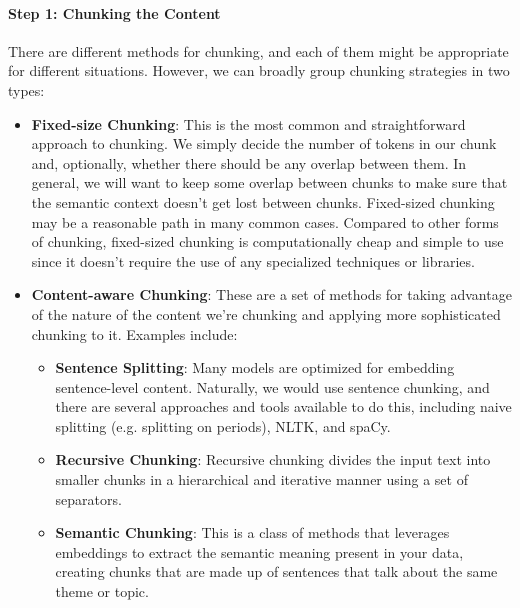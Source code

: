 \paragraph{Step 1: Chunking the Content}

There are different methods for chunking, and each of them might be appropriate for different situations. However, we can broadly group chunking strategies in two types:

\begin{itemize}
\item \textbf{Fixed-size Chunking}: This is the most common and straightforward approach to chunking. We simply decide the number of tokens in our chunk and, optionally, whether there should be any overlap between them. In general, we will want to keep some overlap between chunks to make sure that the semantic context doesn't get lost between chunks. Fixed-sized chunking may be a reasonable path in many common cases. Compared to other forms of chunking, fixed-sized chunking is computationally cheap and simple to use since it doesn't require the use of any specialized techniques or libraries.

\item \textbf{Content-aware Chunking}: These are a set of methods for taking advantage of the nature of the content we're chunking and applying more sophisticated chunking to it. Examples include:
  \begin{itemize}
  \item \textbf{Sentence Splitting}: Many models are optimized for embedding sentence-level content. Naturally, we would use sentence chunking, and there are several approaches and tools available to do this, including naive splitting (e.g. splitting on periods), NLTK, and spaCy.
  \item \textbf{Recursive Chunking}: Recursive chunking divides the input text into smaller chunks in a hierarchical and iterative manner using a set of separators.
  \item \textbf{Semantic Chunking}: This is a class of methods that leverages embeddings to extract the semantic meaning present in your data, creating chunks that are made up of sentences that talk about the same theme or topic.
  \end{itemize}
\end{itemize}

